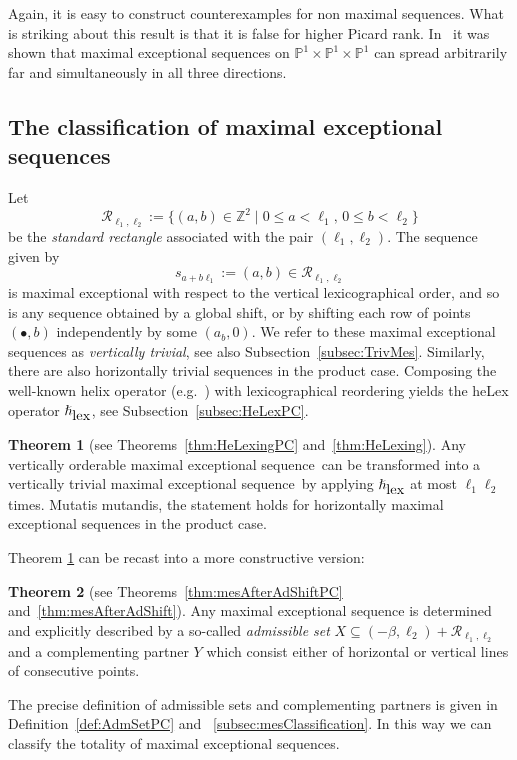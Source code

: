 \documentclass[11pt]{article}
\theoremstyle{definition}
\numberwithin{equation}{section}
\newcommand{\PP}{\mathbb P}
\newcommand{\Z}{\mathbb Z}
\newcommand{\CR}{{\mathcal R}}
\newcommand{\kss}{\scriptscriptstyle}
\newcommand{\kbb}{{\kss \bullet}}
\newcommand{\xb}{\beta}
\newcommand{\cl}{s}
\newcommand{\Rect}{\CR}
\newcommand{\mes}{maximal exceptional sequence}
\newcommand{\helix}{\hslash}
\newcommand{\heLex}{\helix_{\mbox{\tiny lex}}}
\newcommand{\thHelex}{\ref{thm:introC}}
\newtheorem{main}{Theorem}
\begin{document}
Again, it is easy to construct counterexamples 
for non maximal sequences. What is striking 
about this result is that it is false for higher 
Picard rank. In~\cite[Example~3.4]{p1p1p1} 
it was shown that maximal exceptional sequences 
on $\PP^1\times\PP^1\times\PP^1$ can spread 
arbitrarily far and simultaneously in all 
three directions.

\subsection{The classification of {\mes}s}
\label{subsubsec:HeLexing}
{Let
$$
\Rect_{\ell_1,\ell_2}:=\{(a,b)\in\Z^2\mid 
0\leq a<\ell_1,\,0\leq b<\ell_2\}
$$
be the {\em standard rectangle} associated 
with the pair $(\ell_1,\ell_2)$. 
The sequence given by
$$
\cl_{a+b\ell_1}:=(a,b)\in\Rect_{\ell_1,\ell_2}
$$
is maximal exceptional with respect to the vertical 
lexicographical order, and so is any sequence obtained 
by a global shift, or by shifting 
{each row of points $(\kbb,b)$ independently by some $(a_b,0)$.}
We refer to these \mes s as 
{\em vertically trivial}, see also 
Subsection~\ref{subsec:TrivMes}. Similarly, 
there are also horizontally trivial sequences in the 
product case. Composing the well-known helix operator 
(e.g.~\cite{rudakov}) with lexicographical reordering 
yields the heLex operator {$\heLex$}, see 
Subsection~\ref{subsec:HeLexPC}.}

\begin{main} [{see Theorems~\ref{thm:HeLexingPC} and~\ref{thm:HeLexing}}] \label{thm:introC}
Any vertically orderable \mes\ can be transformed 
into a vertically trivial \mes\ by applying $\heLex$ 
at most $\ell_1\ell_2$ times. Mutatis mutandis, the 
statement holds for horizontally \mes s in the 
product case.
 \end{main}

{Theorem {\thHelex} can be recast into a 
more constructive version:}

\begin{main} [{see Theorems~\ref{thm:mesAfterAdShiftPC} and~\ref{thm:mesAfterAdShift}}] \label{thm:introD}
Any {\mes} is determined {and explicitly described}
by a so-called 
{\em admissible set} $X\subseteq(-\xb,\ell_2)
+\Rect_{\ell_1,\ell_2}$ 
and a complementing partner $Y$ which consist either 
of horizontal or vertical lines of consecutive 
points.
 \end{main}

The precise definition of admissible set{s and complementing partners} 
is given in Definition~\ref{def:AdmSetPC} and
~\ref{subsec:mesClassification}. In this way 
we can classify the totality of {\mes}s.
\end{document}
